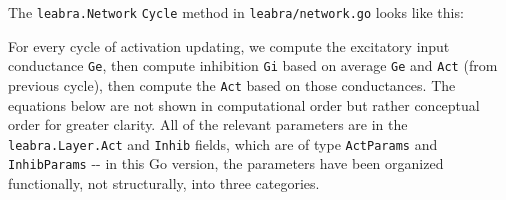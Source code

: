 The \texttt{leabra.Network} \texttt{Cycle} method in
\texttt{leabra/network.go} looks like this:

\begin{Shaded}
\begin{Highlighting}[]
 \OperatorTok{(}\OperatorTok{*}\OperatorTok{)}\OperatorTok{(}\OperatorTok{*}\OperatorTok{)} \OperatorTok{\{}
\OperatorTok{(}\OperatorTok{)} 
\OperatorTok{(}\OperatorTok{)}
\OperatorTok{(}\OperatorTok{)}
\OperatorTok{(}\OperatorTok{)}
\OperatorTok{(}\OperatorTok{)}
\OperatorTok{\}}
\end{Highlighting}
\end{Shaded}

For every cycle of activation updating, we compute the excitatory input
conductance \texttt{Ge}, then compute inhibition \texttt{Gi} based on
average \texttt{Ge} and \texttt{Act} (from previous cycle), then compute
the \texttt{Act} based on those conductances. The equations below are
not shown in computational order but rather conceptual order for greater
clarity. All of the relevant parameters are in the
\texttt{leabra.Layer.Act} and \texttt{Inhib} fields, which are of type
\texttt{ActParams} and \texttt{InhibParams} -\/- in this Go version, the
parameters have been organized functionally, not structurally, into
three categories.


